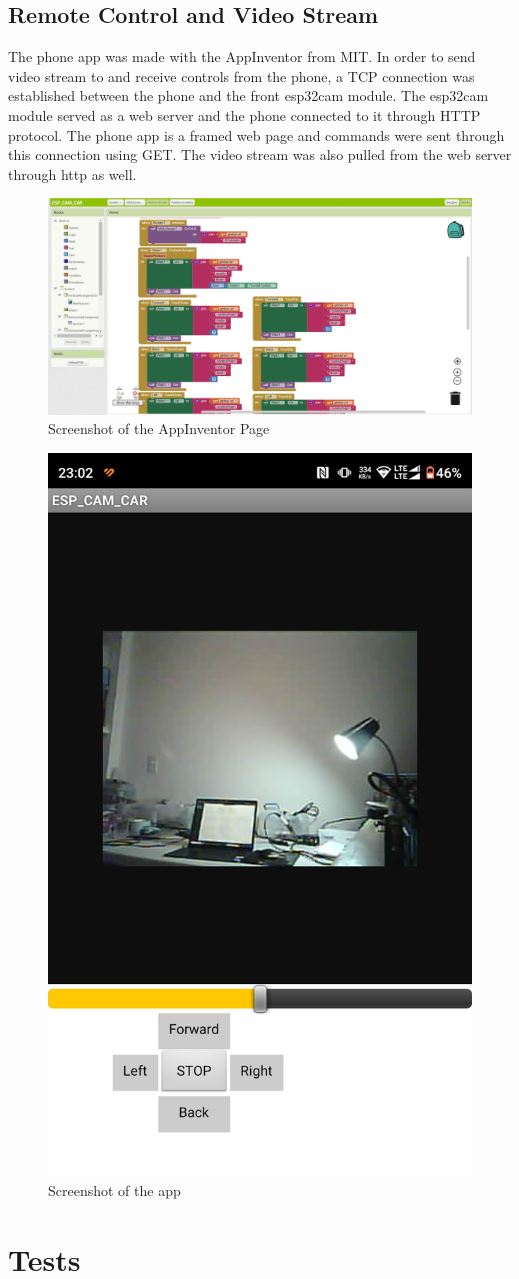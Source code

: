 \documentclass[twoside, 11pt]{article}
\begin{document}
\subsection{Remote Control and Video Stream}
The phone app was made with the AppInventor from MIT. In order to send video stream to and receive controls from the phone, a TCP connection was established between the phone and the front esp32cam module. The esp32cam module served as a web server and the phone connected to it through HTTP protocol. The phone app is a framed web page and commands were sent through this connection using GET. The video stream was also pulled from the web server through http as well. 
\begin{figure} [H]
\centering
	\includegraphics[width=0.5\linewidth]{appinventor}
	\caption{Screenshot of the AppInventor Page}
\end{figure}

\begin{figure} [H]
\centering
	\includegraphics[width=0.2\linewidth]{video stream}
	\caption{Screenshot of the app}
\end{figure}


\section{Tests}
\end{document}
